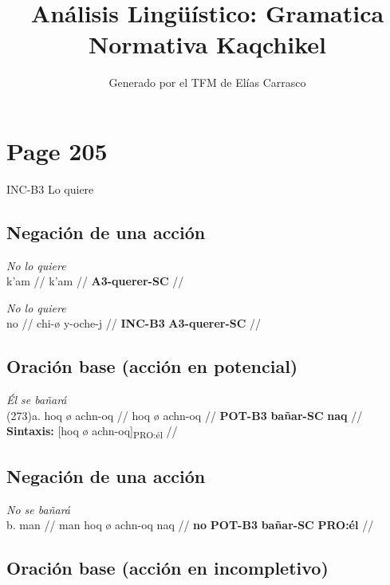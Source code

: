 \documentclass{article}%
\title{Análisis Lingüístico: Gramatica Normativa Kaqchikel}%
\author{Generado por el TFM de Elías Carrasco}%
\begin{document}
%
\normalsize%
\maketitle%
\section{Page 205}%
\label{sec:Page205}%
INC{-}B3 %
Lo quiere %
\subsection{Negación de una acción}%
\label{subsec:Negacindeunaaccin}%

%
\par\medskip%
\ex
\textit{No lo quiere} \\
\begingl
\gla k'am //
\glb k'am //
\glc \textbf{A3-querer-SC} //
\endgl
\xe
%
\medskip%
\par\medskip%
\ex
\textit{No lo quiere} \\
\begingl
\gla no //
\glb chi-ø y-oche-j //
\glc \textbf{INC-B3} \textbf{A3-querer-SC} //
\endgl
\xe
%
\medskip%
\subsection{Oración base (acción en potencial)}%
\label{subsec:Oracinbase(accinenpotencial)}%

%
\par\medskip%
\ex
\textit{Él se bañará} \\
\begingl
\gla (273)a. hoq ø achn-oq //
\glb hoq ø achn-oq //
\glc \textbf{POT-B3} \textbf{bañar-SC} \textbf{naq} //
\glft \textbf{Sintaxis:} [hoq ø achn-oq]\textsubscript{PRO:él} //
\endgl
\xe
%
\medskip%
\subsection{Negación de una acción}%
\label{subsec:Negacindeunaaccin}%

%
\par\medskip%
\ex
\textit{No se bañará} \\
\begingl
\gla b. man //
\glb man hoq ø achn-oq naq //
\glc \textbf{no} \textbf{POT-B3} \textbf{bañar-SC} \textbf{PRO:él} //
\endgl
\xe
%
\medskip%
\subsection{Oración base (acción en incompletivo)}%
\label{subsec:Oracinbase(accinenincompletivo)}%
\end{document}
